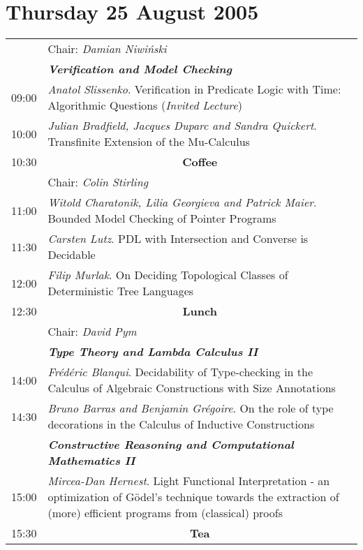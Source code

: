 \documentclass[landscape,12pt]{article}
\newcommand\textbfit[1]{{\bf\em #1}\index{#1}}
\begin{document}
\section*{Thursday 25 August 2005}
\begin{tabular}{p{1cm}p{21cm}}
& Chair: \emph{Damian Niwi\'nski}\\
	& \textbfit{Verification and Model Checking}\\
09:00 & \emph{Anatol Slissenko}. Verification in Predicate Logic with Time:
Algorithmic Questions (\emph{Invited Lecture}) \\
10:00 & 	\emph{Julian Bradfield, Jacques Duparc and Sandra Quickert}. Transfinite Extension of the Mu-Calculus\\
\hline
10:30 & \multicolumn{1}{c}{\textbf{Coffee}}\\
\hline
& Chair: \emph{Colin Stirling}\\
11:00 & 	\emph{Witold Charatonik, Lilia Georgieva and Patrick Maier}. Bounded Model Checking of Pointer Programs\\
11:30 & 	\emph{Carsten Lutz}. PDL with Intersection and Converse is Decidable\\
12:00 & 	\emph{Filip Murlak}. On Deciding Topological Classes of Deterministic Tree Languages\\
\hline
12:30 & 	\multicolumn{1}{c}{\bf Lunch}\\
\hline
& Chair: \emph{David Pym}\\
	& \textbfit{Type Theory and Lambda Calculus II}\\
14:00 & 	\emph{Fr\'ed\'eric Blanqui}. Decidability of Type-checking in the Calculus of Algebraic Constructions with Size Annotations\\
14:30 & 	\emph{Bruno Barras and Benjamin Gr\'egoire}. On the role of type decorations in the Calculus of Inductive Constructions\\
	& \textbfit{Constructive Reasoning and Computational Mathematics II}\\
15:00 & 	\emph{Mircea-Dan Hernest}. Light Functional Interpretation - an optimization of G\"odel's technique towards the extraction of (more) efficient programs from (classical) proofs\\
\hline
15:30 & \multicolumn{1}{c}{\bf Tea}\\

\end{tabular}
\end{document}
